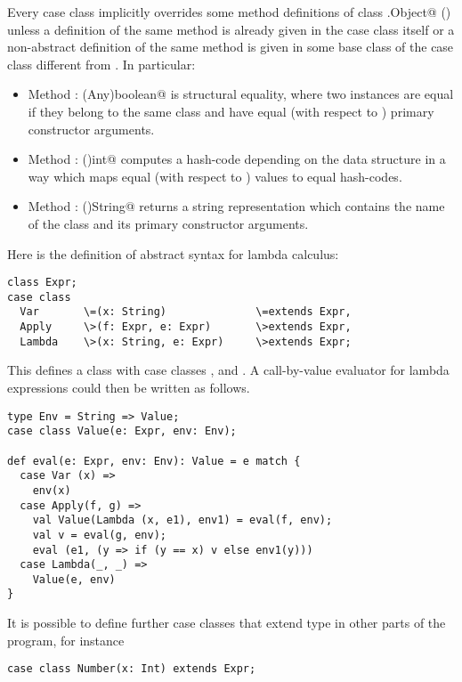 \documentclass[11pt]{report}
\begin{document}
Every case class implicitly overrides some method definitions of class
\verb@scala.Object@ () unless a definition of the same
method is already given in the case class itself or a non-abstract
definition of the same method is given in some base class of the case
class different from \verb@Object@. In particular:
\begin{itemize}
\item[] Method \verb@equals: (Any)boolean@ is structural equality, where two
instances are equal if they belong to the same class and
have equal (with respect to \verb@equals@) primary constructor arguments.
\item[] Method \verb@hashCode: ()int@ computes a hash-code
depending on the data structure in a way which maps equal (with respect to
\verb@equals@) values to equal hash-codes.
\item[] Method \verb@toString: ()String@ returns a string representation which
contains the name of the class and its primary constructor arguments.
\end{itemize}

\example Here is the definition of abstract syntax for lambda
calculus:

\begin{verbatim}
class Expr;
case class
  Var       \=(x: String)              \=extends Expr,
  Apply     \>(f: Expr, e: Expr)       \>extends Expr,
  Lambda    \>(x: String, e: Expr)     \>extends Expr;
\end{verbatim}
This defines a class \verb@Expr@ with case classes
\verb@Var@, \verb@Apply@ and \verb@Lambda@. A call-by-value evaluator for lambda
expressions could then be written as follows.

\begin{verbatim}
type Env = String => Value;
case class Value(e: Expr, env: Env);

def eval(e: Expr, env: Env): Value = e match {
  case Var (x) =>
    env(x)
  case Apply(f, g) =>
    val Value(Lambda (x, e1), env1) = eval(f, env);
    val v = eval(g, env);
    eval (e1, (y => if (y == x) v else env1(y)))
  case Lambda(_, _) =>
    Value(e, env)
}
\end{verbatim}

It is possible to define further case classes that extend type
\verb@Expr@ in other parts of the program, for instance
\begin{verbatim}
case class Number(x: Int) extends Expr;
\end{verbatim}
\end{document}
